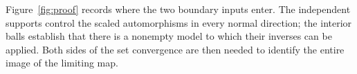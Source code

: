 \documentclass[11pt]{article}
\numberwithin{equation}{section}
\theoremstyle{definition}
\theoremstyle{remark}
\begin{document}
Figure~\ref{fig:proof} records where the two boundary inputs enter. The
independent supports control the scaled automorphisms in every normal
direction; the interior balls establish that there is a nonempty model to
which their inverses can be applied. Both sides of the set convergence are
then needed to identify the entire image of the limiting map.









\end{document}
